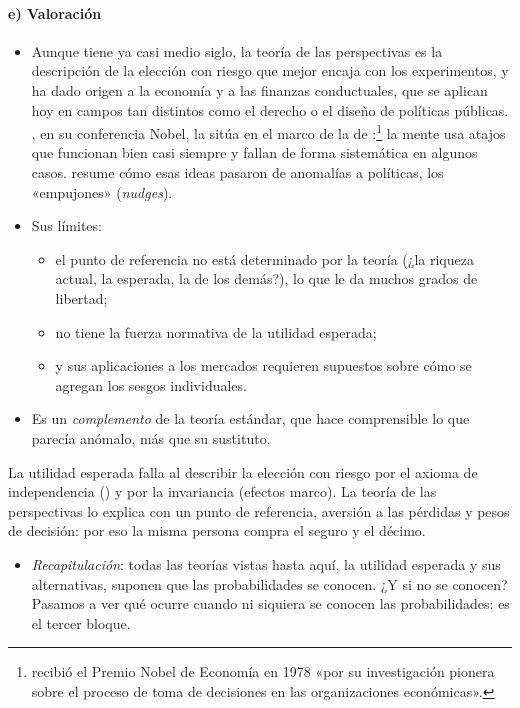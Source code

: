 \documentclass[11pt]{article}
\begin{document}
\paragraph{e) Valoración}

\begin{itemize}
\item Aunque tiene ya casi medio siglo, la teoría de las perspectivas es la descripción de la elección con riesgo que mejor encaja con los experimentos, y ha dado origen a la economía y a las finanzas conductuales, que se aplican hoy en campos tan distintos como el derecho o el diseño de políticas públicas. \textcite{Kahneman2003Maps}, en su conferencia Nobel, la sitúa en el marco de la  de \textcite{Simon1955Behavioral}:\footnote{ recibió el Premio Nobel de Economía en 1978 «por su investigación pionera sobre el proceso de toma de decisiones en las organizaciones económicas»\nocite{Nobel1978Simon}.} la mente usa atajos que funcionan bien casi siempre y fallan de forma sistemática en algunos casos. \textcite{Thaler2018Cashews} resume cómo esas ideas pasaron de anomalías a políticas, los «empujones» (\emph{nudges}).
\item Sus límites:
  \begin{itemize}
  \item el punto de referencia no está determinado por la teoría (¿la riqueza actual, la esperada, la de los demás?), lo que le da muchos grados de libertad;
  \item no tiene la fuerza normativa de la utilidad esperada;
  \item y sus aplicaciones a los mercados requieren supuestos sobre cómo se agregan los sesgos individuales.
  \end{itemize}
\item Es un \emph{complemento} de la teoría estándar, que hace comprensible lo que parecía anómalo, más que su sustituto.
\end{itemize}

\begin{ideaclave}
La utilidad esperada falla al describir la elección con riesgo por el axioma de independencia () y por la invariancia (efectos marco). La teoría de las perspectivas lo explica con un punto de referencia, aversión a las pérdidas y pesos de decisión: por eso la misma persona compra el seguro y el décimo.
\end{ideaclave}

\begin{itemize}
\item \emph{Recapitulación}: todas las teorías vistas hasta aquí, la utilidad esperada y sus alternativas, suponen que las probabilidades se conocen. ¿Y si no se conocen? Pasamos a ver qué ocurre cuando ni siquiera se conocen las probabilidades: es el tercer bloque.
\end{itemize}
\end{document}

